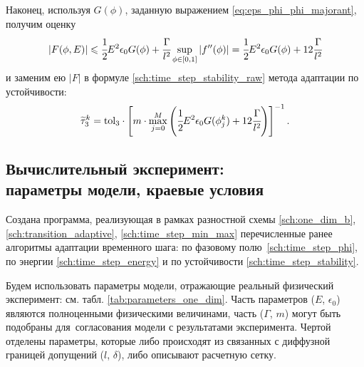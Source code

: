Наконец, используя $G(\phi)$, заданную выражением \eqref{eq:eps_phi_phi_majorant}, получим оценку
\[
    |F(\phi, E)| \leqslant \cfrac{1}{2} E^2 \epsilon_0 G(\phi) + \cfrac{\Gamma}{l^2} \sup_{\phi \in [0, 1]} |f''(\phi)| = \cfrac{1}{2} E^2 \epsilon_0 G(\phi) + 12 \cfrac{\Gamma}{l^2}
\]
и заменим ею $|F|$ в формуле \eqref{sch:time_step_stability_raw} метода адаптации по устойчивости:
\begin{equation}
    \widetilde{\tau}_3^k = {\text{tol}}_3 \cdot \left[ m \cdot \max\limits_{j = 0}^M \left( \cfrac{1}{2} E^2 \epsilon_0 G(\phi_j^k) + 12 \cfrac{\Gamma}{l^2} \right) \right]^{-1}.
    \label{sch:time_step_stability}
\end{equation}


\subsection[Вычислительный эксперимент: параметры модели, краевые условия]{Вычислительный эксперимент: \\ параметры модели, краевые условия}

Создана программа, реализующая в рамках разностной схемы \eqref{sch:one_dim_b}, \eqref{sch:transition_adaptive}, \eqref{sch:time_step_min_max} перечисленные ранее алгоритмы адаптации временного шага: по фазовому полю~\eqref{sch:time_step_phi}, по энергии \eqref{sch:time_step_energy} и по устойчивости \eqref{sch:time_step_stability}.

Будем использовать параметры модели, отражающие реальный физический эксперимент: см. табл. \ref{tab:parameters_one_dim}. Часть параметров ($E$, $\epsilon_0$) являются полноценными физическими величинами, часть ($\Gamma$, $m$) могут быть подобраны для~согласования модели с результатами эксперимента. Чертой отделены параметры, которые либо происходят из связанных с диффузной границей допущений ($l$, $\delta$), либо описывают расчетную сетку.

